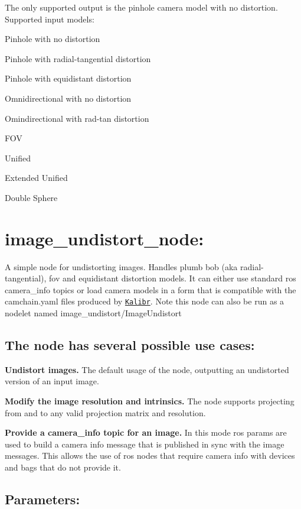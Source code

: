 The only supported output is the pinhole camera model with no distortion. Supported input models\+:


\begin{DoxyItemize}
\item Pinhole with no distortion
\item Pinhole with radial-\/tangential distortion
\item Pinhole with equidistant distortion
\item Omnidirectional with no distortion
\item Omindirectional with rad-\/tan distortion
\item F\+OV
\item Unified
\item Extended Unified
\item Double Sphere
\end{DoxyItemize}\hypertarget{md_vision_layer_image_undistort_README_autotoc_md95}{}\section{image\+\_\+undistort\+\_\+node\+:}\label{md_vision_layer_image_undistort_README_autotoc_md95}
A simple node for undistorting images. Handles plumb bob (aka radial-\/tangential), fov and equidistant distortion models. It can either use standard ros camera\+\_\+info topics or load camera models in a form that is compatible with the camchain.\+yaml files produced by \href{https://github.com/ethz-asl/kalibr}{\tt Kalibr}. Note this node can also be run as a nodelet named image\+\_\+undistort/\+Image\+Undistort\hypertarget{md_vision_layer_image_undistort_README_autotoc_md96}{}\subsection{The node has several possible use cases\+:}\label{md_vision_layer_image_undistort_README_autotoc_md96}

\begin{DoxyItemize}
\item {\bfseries Undistort images.} The default usage of the node, outputting an undistorted version of an input image.
\item {\bfseries Modify the image resolution and intrinsics.} The node supports projecting from and to any valid projection matrix and resolution.
\item {\bfseries Provide a camera\+\_\+info topic for an image.} In this mode ros params are used to build a camera info message that is published in sync with the image messages. This allows the use of ros nodes that require camera info with devices and bags that do not provide it.
\end{DoxyItemize}\hypertarget{md_vision_layer_image_undistort_README_autotoc_md97}{}\subsection{Parameters\+:}\label{md_vision_layer_image_undistort_README_autotoc_md97}

